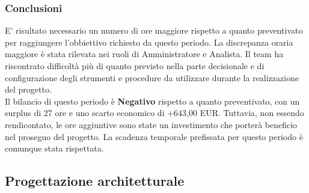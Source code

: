 \subsubsection{Conclusioni}
E' risultato necessario un numero di ore maggiore rispetto a quanto preventivato per raggiungere l'obbiettivo richiesto da questo periodo. La discrepanza oraria maggiore è stata rilevata nei ruoli di Amministratore e Analista. Il team ha riscontrato difficoltà più di quanto previsto nella parte decisionale e di configurazione degli strumenti e procedure da utilizzare durante la realizzazione del progetto.
\\Il bilancio di questo periodo è \textbf{Negativo} rispetto a quanto preventivato, con un surplus di 27 ore e uno scarto economico di +643,00 EUR. Tuttavia, non essendo rendicontato, le ore aggiuntive sono state un investimento che porterà beneficio nel proseguo del progetto. La scadenza temporale prefissata per questo periodo è comunque stata rispettata.

\newpage
\subsection{Progettazione architetturale}
